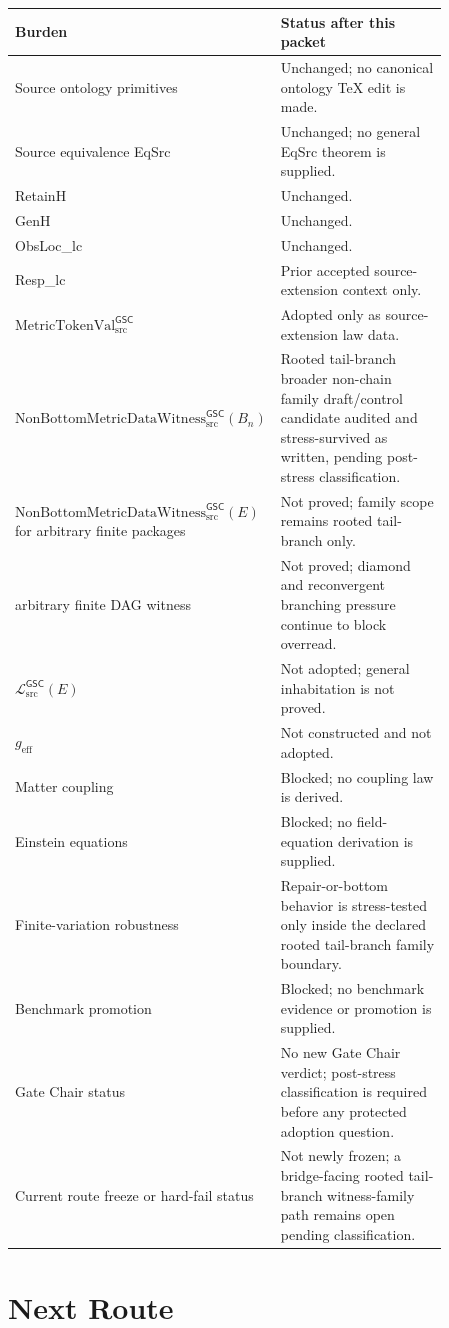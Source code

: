 \documentclass[11pt]{article}
\newcommand{\MetricTokenVal}{\mathrm{MetricTokenVal}_{\mathrm{src}}^{\mathsf{GSC}}}
\newcommand{\Witness}{\mathrm{NonBottomMetricDataWitness}_{\mathrm{src}}^{\mathsf{GSC}}}
\newcommand{\MetricData}{\mathcal{L}_{\mathrm{src}}^{\mathsf{GSC}}}
\newcommand{\geff}{g_{\mathrm{eff}}}
\newcommand{\Bn}{B_n}
\begin{document}
\begin{longtable}{p{0.30\linewidth}p{0.56\linewidth}}
\toprule
Burden & Status after this packet \\
\midrule
Source ontology primitives & Unchanged; no canonical ontology TeX edit is made. \\
Source equivalence EqSrc & Unchanged; no general EqSrc theorem is supplied. \\
RetainH & Unchanged. \\
GenH & Unchanged. \\
ObsLoc\_lc & Unchanged. \\
Resp\_lc & Prior accepted source-extension context only. \\
\(\MetricTokenVal\) & Adopted only as source-extension law data. \\
\(\Witness(\Bn)\) & Rooted tail-branch broader non-chain family draft/control
candidate audited and stress-survived as written, pending post-stress
classification. \\
\(\Witness(E)\) for arbitrary finite packages & Not proved; family scope
remains rooted tail-branch only. \\
arbitrary finite DAG witness & Not proved; diamond and reconvergent branching
pressure continue to block overread. \\
\(\MetricData(E)\) & Not adopted; general inhabitation is not proved. \\
\(\geff\) & Not constructed and not adopted. \\
Matter coupling & Blocked; no coupling law is derived. \\
Einstein equations & Blocked; no field-equation derivation is supplied. \\
Finite-variation robustness & Repair-or-bottom behavior is stress-tested only
inside the declared rooted tail-branch family boundary. \\
Benchmark promotion & Blocked; no benchmark evidence or promotion is supplied. \\
Gate Chair status & No new Gate Chair verdict; post-stress classification is
required before any protected adoption question. \\
Current route freeze or hard-fail status & Not newly frozen; a
bridge-facing rooted tail-branch witness-family path remains open pending
classification. \\
\bottomrule
\end{longtable}

\section{Next Route}
\end{document}
